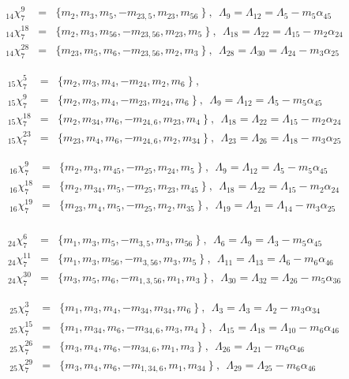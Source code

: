 \documentclass[a4paper]{jpconf}
\def\np{\newpage}
\def\bb {\begin {eqnarray}}
\def\eqnn#1{\bb\label{#1}}
\def\eea {\end {eqnarray}}
\def\nn{\nonumber}
\def\np{\vfill\eject}
\def\a{\alpha}
\def\L{\Lambda}
\begin{document}
  \eqnn{slt714}
 _{14}\chi^9_7 &=& \{ m_{2}, m_{3}, m_{5}, -m_{23,5}, m_{23}, m_{56} \   \} \ ,~~\L_9 = \L_{12} =\L_5 - m_5 \a_{45} \\ %
   _{14}\chi^{18}_7 &=& \{ m_{2}, m_{3}, m_{56}, -m_{23,56}, m_{23}, m_{5} \   \} \ ,~~\L_{18} = \L_{22} = \L_{15} - m_2 \a_{24}  \nn\\ %
   _{14}\chi^{28}_7 &=& \{ m_{23}, m_{5}, m_{6}, -m_{23,56}, m_{2}, m_{3} \   \} \ ,~~\L_{28} = \L_{30} = \L_{24} - m_3 \a_{25}   %
      \nn\eea %

      \eqnn{slt715}
   _{15}\chi^5_7 &=& \{ m_{2}, m_{3}, m_{4}, -m_{24}, m_{2}, m_6 \   \} \ ,~ \\ %
 _{15}\chi^9_7 &=& \{ m_{2}, m_{3}, m_{4}, -m_{23}, m_{24}, m_{6} \   \} \ ,~~\L_9 = \L_{12} =\L_5 - m_5 \a_{45} \nn\\ %
      _{15}\chi^{18}_7 &=& \{ m_{2}, m_{34}, m_{6}, -m_{24,6}, m_{23}, m_{4} \   \} \ ,~~\L_{18} = \L_{22} = \L_{15} - m_2 \a_{24}  \nn\\ %
  _{15}\chi^{23}_7 &=& \{ m_{23}, m_{4}, m_{6}, -m_{24,6}, m_{2}, m_{34} \   \} \ ,~~\L_{23} = \L_{26} = \L_{18} - m_3 \a_{25}    %
        \nn\eea %

      \eqnn{slt716}
    _{16}\chi^9_7 &=& \{ m_{2}, m_{3}, m_{45}, -m_{25}, m_{24}, m_{5} \   \} \ ,~~\L_9 = \L_{12} =\L_5 - m_5 \a_{45} \\ %
      _{16}\chi^{18}_7 &=& \{ m_{2}, m_{34}, m_{5}, -m_{25}, m_{23}, m_{45} \   \} \ ,~~\L_{18} = \L_{22} = \L_{15} - m_2 \a_{24}  \nn\\ %
_{16}\chi^{19}_7 &=& \{ m_{23}, m_{4}, m_{5}, -m_{25}, m_{2}, m_{35} \   \} \ ,~~\L_{19} = \L_{21} = \L_{14} - m_3 \a_{25} \nn\\ %
    \nn\eea %

  \eqnn{slt724}
       _{24}\chi^6_7 &=& \{ m_1, m_{3}, m_{5}, -m_{3,5}, m_{3}, m_{56} \   \} \ ,~~\L_6 = \L_9 = \L_3 - m_5 \a_{45} \\ %
  _{24}\chi^{11}_7 &=& \{ m_1, m_{3}, m_{56}, -m_{3,56}, m_{3}, m_{5} \   \} \ ,~~\L_{11} = \L_{13} = \L_6 - m_6 \a_{46}  \nn\\ %
      _{24}\chi^{30}_7 &=& \{ m_{3}, m_{5}, m_{6}, -m_{1,3,56}, m_{1}, m_{3} \   \} \ ,~~\L_{30} = \L_{32} =\L_{26} - m_5 \a_{36}
 \nn  \eea

  \eqnn{slt725}
  _{25}\chi^3_7 &=& \{ m_1, m_{3}, m_{4}, -m_{34}, m_{34}, m_6 \   \} \ ,~~\L_3 = \L_3 = \L_2 - m_3 \a_{34} \\ %
         _{25}\chi^{15}_7 &=& \{ m_1, m_{34}, m_{6}, -m_{34,6}, m_{3}, m_{4} \   \} \ ,~~\L_{15} = \L_{18} = \L_{10} - m_6 \a_{46}  \nn\\ %
      _{25}\chi^{26}_7 &=& \{ m_{3}, m_{4}, m_{6}, -m_{34,6}, m_{1}, m_{3} \   \} \ ,~~\L_{26} = \L_{21} - m_6 \a_{46} \nn\\ %
  _{25}\chi^{29}_7 &=& \{ m_{3}, m_{4}, m_{6}, -m_{1,34,6}, m_{1}, m_{34} \   \} \ ,~~\L_{29} = \L_{25} - m_6 \a_{46}
 \nn   \eea
\end{document}
